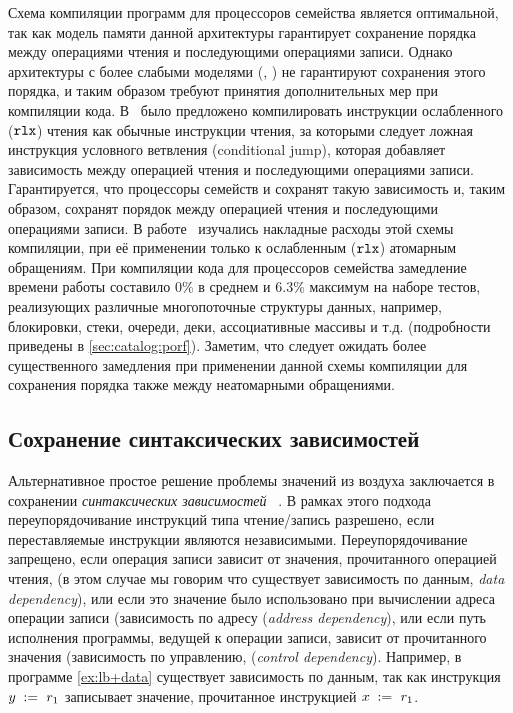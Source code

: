 Схема компиляции программ для процессоров семейства \Intel является оптимальной, так как модель памяти данной 
архитектуры гарантирует сохранение порядка 
между операциями чтения и последующими операциями записи. 
Однако архитектуры с более слабыми моделями (\ARM, \POWER)
не гарантируют сохранения этого порядка, 
и таким образом требуют принятия дополнительных мер при компиляции кода. 
В~\cite{Boehm-Demsky:MSPC14} было предложено компилировать 
инструкции ослабленного ($\mathtt{rlx}$) чтения как обычные инструкции чтения, 
за которыми следует ложная инструкция условного ветвления 
(conditional jump), которая добавляет зависимость 
между операцией чтения и последующими операциями записи. 
Гарантируется, что процессоры семейств \ARM и \POWER 
сохранят такую зависимость и, таким образом, 
сохранят порядок между операцией чтения и последующими операциями записи. 
В работе~\cite{Ou-Demsky:OOPSLA18} изучались 
накладные расходы этой схемы компиляции, 
при её применении только к ослабленным ($\mathtt{rlx}$) атомарным обращениям.
При компиляции кода для процессоров семейства  
замедление времени работы составило 0\% в среднем и 6.3\% максимум 
на наборе тестов, реализующих различные многопоточные 
структуры данных, например, блокировки, стеки, очереди, 
деки, ассоциативные массивы и т.д.
(подробности приведены в \ref{sec:catalog:porf}).
Заметим, что следует ожидать более существенного замедления
при применении данной схемы компиляции для 
сохранения порядка также между неатомарными обращениями. 

\subsection{Сохранение синтаксических зависимостей}
\label{sec:analysis:deprf}

Альтернативное простое решение проблемы значений из воздуха 
заключается в сохранении \emph{синтаксических зависимостей}~%
\cite{Boehm-Demsky:MSPC14, Alglave-al:ASPLOS18}.
В рамках этого подхода переупорядочивание инструкций типа чтение/запись 
разрешено, если переставляемые инструкции являются независимыми. 
Переупорядочивание запрещено, если операция записи зависит 
от значения, прочитанного операцией чтения, 
(в этом случае мы говорим что существует зависимость по данным, \emph{data dependency}),
или если это значение было использовано при вычислении адреса операции записи 
(зависимость по адресу (\emph{address dependency}), 
или если путь исполнения программы, ведущей к операции записи, 
зависит от прочитанного значения 
(зависимость по управлению, (\emph{control dependency}).
Например, в программе \ref{ex:lb+data} 
существует зависимость по данным, так как 
инструкция $y\;:=_{}\;r_1$ записывает 
значение, прочитанное инструкцией $x\;:=_{}\;r_1$. 

